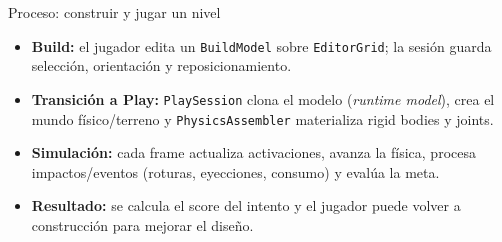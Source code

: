 \documentclass[aspectratio=169,11pt]{beamer}
\begin{document}
\begin{frame}{Proceso: construir y jugar un nivel}
  \begin{center}
  \end{center}

  \vspace{0.15cm}
  \begin{itemize}
    \item \textbf{Build:} el jugador edita un \texttt{BuildModel} sobre \texttt{EditorGrid}; la sesión guarda selección, orientación y reposicionamiento.
    \item \textbf{Transición a Play:} \texttt{PlaySession} clona el modelo (\emph{runtime model}), crea el mundo físico/terreno y \texttt{PhysicsAssembler} materializa rigid bodies y joints.
    \item \textbf{Simulación:} cada frame actualiza activaciones, avanza la física, procesa impactos/eventos (roturas, eyecciones, consumo) y evalúa la meta.
    \item \textbf{Resultado:} se calcula el score del intento y el jugador puede volver a construcción para mejorar el diseño.
  \end{itemize}
\end{frame}
\end{document}
